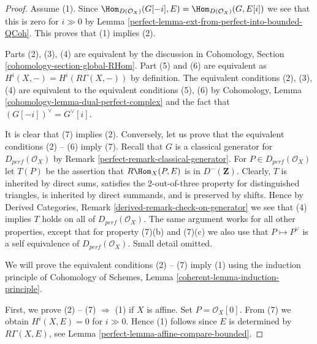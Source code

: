 \begin{proof}

Assume (1). Since
$\Hom_{D(\mathcal{O}_X)}(G[-i], E) = \Hom_{D(\mathcal{O}_X)}(G, E[i])$
we see that this is zero for $i \gg 0$ by
Lemma \ref{perfect-lemma-ext-from-perfect-into-bounded-QCoh}. This proves
that (1) implies (2).

\medskip\noindent
Parts (2), (3), (4) are equivalent by the discussion in
Cohomology, Section \ref{cohomology-section-global-RHom}.
Part (5) and (6) are equivalent as $H^i(X, -) = H^i(R\Gamma(X, -))$
by definition. The equivalent conditions (2), (3), (4) are
equivalent to the equivalent conditions (5), (6) by
Cohomology, Lemma \ref{cohomology-lemma-dual-perfect-complex}
and the fact that $(G[-i])^\vee = G^\vee[i]$.

\medskip\noindent
It is clear that (7) implies (2). Conversely,
let us prove that the equivalent conditions (2) -- (6) imply (7).
Recall that $G$ is a  classical generator for $D_{perf}(\mathcal{O}_X)$ by
Remark \ref{perfect-remark-classical-generator}.
For $P \in D_{perf}(\mathcal{O}_X)$ let $T(P)$ be the assertion that
$R\Hom_X(P, E)$ is in $D^-(\mathbf{Z})$.
Clearly, $T$ is inherited by direct sums,
satisfies the 2-out-of-three property for distinguished
triangles, is inherited by direct summands, and is preserved by shifts.
Hence by Derived Categories, Remark \ref{derived-remark-check-on-generator}
we see that (4) implies $T$ holds on all of $D_{perf}(\mathcal{O}_X)$.
The same argument works for all other properties, except that for property
(7)(b) and (7)(c) we also use that $P \mapsto P^\vee$ is a self
equivalence of $D_{perf}(\mathcal{O}_X)$. Small detail omitted.

\medskip\noindent
We will prove the equivalent conditions (2) -- (7) imply (1)
using the induction principle of
Cohomology of Schemes, Lemma \ref{coherent-lemma-induction-principle}.

\medskip\noindent
First, we prove (2) -- (7) $\Rightarrow$ (1) if $X$ is affine.
Set $P = \mathcal{O}_X[0]$. From (7) we obtain $H^i (X, E) = 0$ for $i \gg 0$.
Hence (1) follows since $E$ is determined by $R\Gamma (X, E)$,
see Lemma \ref{perfect-lemma-affine-compare-bounded}.


\end{proof}

